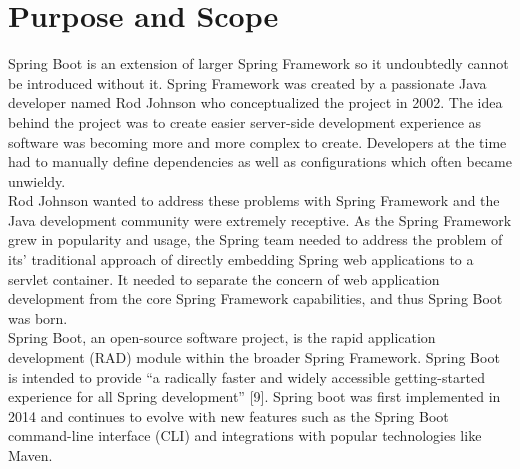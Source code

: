 \section{Purpose and Scope}

Spring Boot is an extension of larger Spring Framework so it undoubtedly cannot be introduced without it. Spring Framework was created by a passionate Java developer named Rod Johnson who conceptualized the project in 2002. The idea behind the project was to create easier server-side development experience as software was becoming more and more complex to create. Developers at the time had to manually define dependencies as well as configurations which often became unwieldy.\\

Rod Johnson wanted to address these problems with Spring Framework and the Java development community were extremely receptive. As the Spring Framework grew in popularity and usage, the Spring team needed to address the problem of its' traditional approach of directly embedding Spring web applications to a servlet container. It needed to separate the concern of web application development from the core Spring Framework capabilities, and thus Spring Boot was born.\\

Spring Boot, an open-source software project, is the rapid application development (RAD)
module within the broader Spring Framework. Spring Boot is intended to provide “a radically
faster and widely accessible getting-started experience for all Spring development” [9]. Spring boot was first implemented in 2014 and continues to evolve with new features such as the Spring Boot command-line interface (CLI) and integrations with popular technologies like Maven.